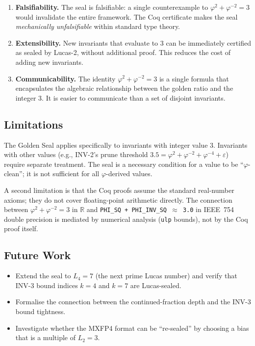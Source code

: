 \begin{enumerate}
  \item \textbf{Falsifiability.} The seal is falsifiable: a
        single counterexample to $\varphi^2 + \varphi^{-2}
        = 3$ would invalidate the entire framework.  The
        Coq certificate makes the seal \emph{mechanically
        unfalsifiable} within standard type theory.

  \item \textbf{Extensibility.} New invariants that evaluate
        to $3$ can be immediately certified as sealed by
        Lucas-2, without additional proof.  This reduces the
        cost of adding new invariants.

  \item \textbf{Communicability.} The identity
        $\varphi^2 + \varphi^{-2} = 3$ is a single formula
        that encapsulates the algebraic relationship between
        the golden ratio and the integer $3$.  It is easier
        to communicate than a set of disjoint invariants.
\end{enumerate}

\subsection{Limitations}

The Golden Seal applies specifically to invariants with
integer value $3$.  Invariants with other values (e.g.,
INV-2's prune threshold $3.5 = \varphi^2 + \varphi^{-2} +
\varphi^{-4} + \varepsilon$) require separate treatment.
The seal is a necessary condition for a value to be
``$\varphi$-clean''; it is not sufficient for all
$\varphi$-derived values.

A second limitation is that the Coq proofs assume the
standard real-number axioms; they do not cover floating-point
arithmetic directly.  The connection between
$\varphi^2 + \varphi^{-2} = 3$ in $\mathbb{R}$ and
\texttt{PHI\_SQ + PHI\_INV\_SQ $\approx$ 3.0} in IEEE~754
double precision is mediated by numerical analysis
(\texttt{ulp} bounds), not by the Coq proof itself.

\subsection{Future Work}

\begin{itemize}
  \item Extend the seal to $L_4 = 7$ (the next prime Lucas
        number) and verify that INV-3 bound indices $k = 4$
        and $k = 7$ are Lucas-sealed.
  \item Formalise the connection between the continued-fraction
        depth and the INV-3 bound tightness.
  \item Investigate whether the MXFP4 format can be
        ``re-sealed'' by choosing a bias that is a multiple
        of $L_2 = 3$.
\end{itemize}

